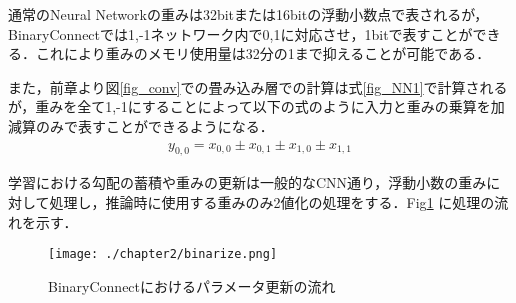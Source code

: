 通常のNeural Networkの重みは32bitまたは16bitの浮動小数点で表されるが，BinaryConnectでは1,-1ネットワーク内で0,1に対応させ，1bitで表すことができる．これにより重みのメモリ使用量は32分の1まで抑えることが可能である．

また，前章より図\ref{fig_conv}での畳み込み層での計算は式\ref{fig_NN1}で計算されるが，重みを全て1,-1にすることによって以下の式のように入力と重みの乗算を加減算のみで表すことができるようになる．
\begin{align}
  y_{0,0} = x_{0,0} \pm x_{0,1} \pm x_{1,0} \pm x_{1,1}
\end{align}

学習における勾配の蓄積や重みの更新は一般的なCNN通り，浮動小数の重みに対して処理し，推論時に使用する重みのみ2値化の処理をする．Fig\ref{fig_binarize} に処理の流れを示す．
\begin{figure}[]
  \begin{center}
    \texttt{[image: ./chapter2/binarize.png]}
    \caption{BinaryConnectにおけるパラメータ更新の流れ}
    \label{fig_binarize}
  \end{center}
\end{figure}